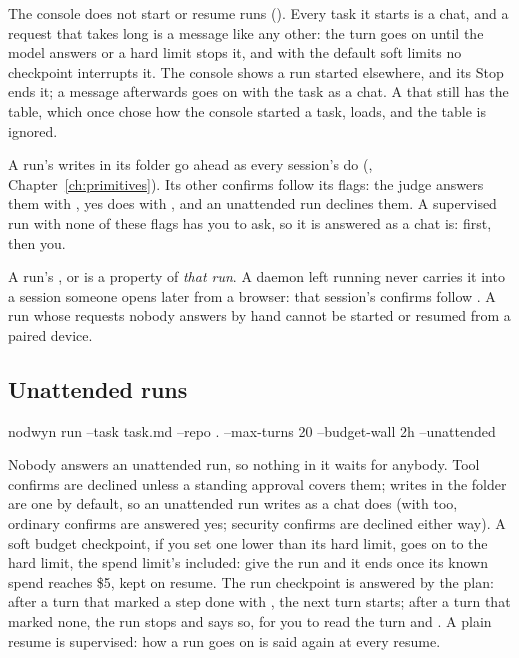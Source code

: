 The console does not start or resume runs (). Every task it starts
is a chat, and a request that takes long is a message like any other: the
turn goes on until the model answers or a hard limit stops it, and with the
default soft limits no checkpoint interrupts it. The console shows a run
started elsewhere, and its Stop ends it; a message afterwards goes on with
the task as a chat. A  that still has the \code{[tasks]}
table, which once chose how the console started a task, loads, and the
table is ignored.

A run's writes in its folder go ahead as every session's do
(, Chapter~\ref{ch:primitives}). Its other confirms
follow its flags: the judge answers them with , yes does
with , and an unattended run declines them. A supervised run
with none of these flags has you to ask, so it is answered as a chat is:
 first, then you.

\begin{careful}
A run's ,  or  is a
property of \emph{that run}. A daemon left running never carries it into a
session someone opens later from a browser: that session's confirms follow
\code{[approval]}. A run whose requests nobody answers by hand cannot be
started or resumed from a paired device.
\end{careful}

\subsection{Unattended runs}

\begin{sh}
nodwyn run --task task.md --repo . --max-turns 20 --budget-wall 2h --unattended
\end{sh}

Nobody answers an unattended run, so nothing in it waits for anybody. Tool
confirms are declined unless a standing approval covers them; writes in the
folder are one by default, so an unattended run writes as a chat does
(with  too, ordinary confirms are answered yes; security
confirms are declined either way). A soft budget checkpoint, if you set one
lower than its hard limit, goes on to the hard limit, the spend limit's
included: give the run  and it ends 
once its known spend reaches \$5, kept on resume.
The run checkpoint is answered by the plan: after a turn that marked a step
done with , the next turn starts; after a turn that marked
none, the run stops and says so, for you to read the turn and
. A plain resume is
supervised: how a run goes on is said again at every resume.

